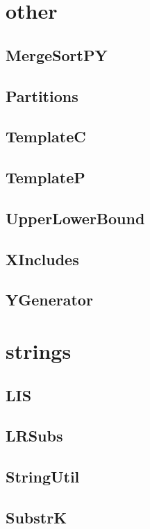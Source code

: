 \section{other}
\subsection{ MergeSortPY}
\raggedbottom
\hrulefill
\subsection{ Partitions}
\raggedbottom
\hrulefill
\subsection{ TemplateC}
\raggedbottom
\hrulefill
\subsection{ TemplateP}
\raggedbottom
\hrulefill
\subsection{ UpperLowerBound}
\raggedbottom
\hrulefill
\subsection{ XIncludes}
\raggedbottom
\hrulefill
\subsection{ YGenerator}
\raggedbottom
\hrulefill

\section{strings}
\subsection{ LIS}
\raggedbottom
\hrulefill
\subsection{ LRSubs}
\raggedbottom
\hrulefill
\subsection{ StringUtil}
\raggedbottom
\hrulefill
\subsection{ SubstrK}
\raggedbottom
\hrulefill

